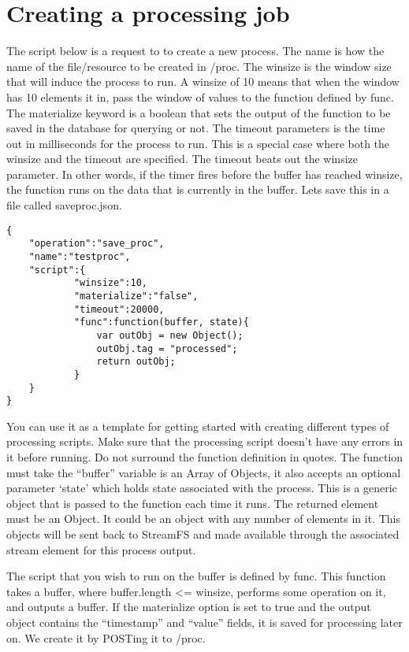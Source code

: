 \section{Creating a processing job}

The script below is a request to to create a new process. The name is how the name of the file/resource to be created in /proc. The winsize is the window size that will induce the process to run. A winsize of 10 means that when the window has 10 elements it in, pass the window of values to the function defined by func. The materialize keyword is a boolean that sets the output of the function to be saved in the database for querying or not. The timeout parameters is the time out in milliseconds for the process to run. This is a special case where both the winsize and the timeout are specified. The timeout beats out the winsize parameter. In other words, if the timer fires before the buffer has reached winsize, the function runs on the data that is currently in the buffer. Lets save this in a file called saveproc.json.

\begin{lstlisting}
{
    "operation":"save_proc",
    "name":"testproc",
    "script":{
            "winsize":10,
            "materialize":"false",
            "timeout":20000,
            "func":function(buffer, state){ 
                var outObj = new Object();
                outObj.tag = "processed";
                return outObj;
            }
    }
}
\end{lstlisting}

You can use it as a template for getting started with creating different types of processing scripts. Make sure that the processing script doesn't have any errors in it before running. Do not surround the function definition in quotes. The function must take the ``buffer'' variable is an Array of Objects, it also accepts an optional parameter `state' which holds state associated with the process. This is a generic object that is passed to the function each time it runs. The returned element must be an Object. It could be an object with any number of elements in it. This objects will be sent back to StreamFS and made available through the associated stream element for this process output.

The script that you wish to run on the buffer is defined by func. This function takes a buffer, where buffer.length <= winsize, performs some operation on it, and outputs a buffer. If the materialize option is set to true and the output object contains the ``timestamp'' and ``value'' fields, it is saved for processing later on. We create it by POSTing it to /proc.

